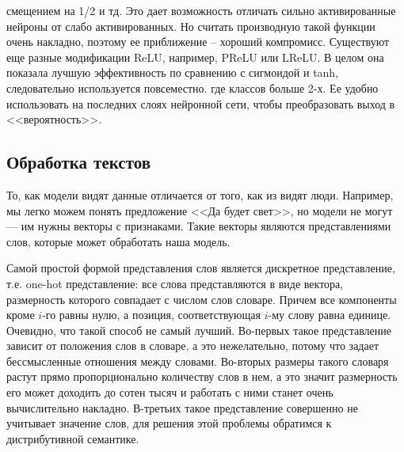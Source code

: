 смещением на 1/2 и тд. Это дает возможность отличать сильно активированные нейроны от слабо активированных.
Но считать производную такой функции очень накладно, поэтому ее приближение -- хороший компромисс. Существуют
еще разные модификации ReLU, например, PReLU или LReLU. В целом она показала лучшую эффективность по сравнению
с сигмоидой и tanh, следовательно используется повсеместно.
%
где классов больше 2-х. Ее удобно использовать на последних слоях нейронной сети, чтобы преобразовать выход в
<<вероятность>>.


































\subsection{Обработка текстов}
\label{section:textRepsesentation}

То, как модели видят данные отличается от того, как из видят люди. Например, мы легко можем понять
предложение <<Да будет свет>>, но модели не могут --- им нужны векторы с признаками. Такие векторы являются
представлениями слов, которые может обработать наша модель.

\bigskip
Самой простой формой представления слов является дискретное представление, т.е. one-hot представление: все
слова представляются в виде вектора, размерность которого совпадает с числом слов словаре. Причем все
компоненты кроме $i$-го равны нулю, а позиция, соответствующая $i$-му слову равна единице. Очевидно, что такой
способ не самый лучший. Во-первых такое представление зависит от положения слов в словаре, а это нежелательно,
потому что задает бессмысленные отношения между словами. Во-вторых размеры такого словаря растут прямо
пропорционально количеству слов в нем, а это значит размерность его может доходить до сотен тысяч и работать с
ними станет очень вычислительно накладно. В-третьих такое представление совершенно не учитывает значение слов,
для решения этой проблемы обратимся к дистрибутивной семантике.

